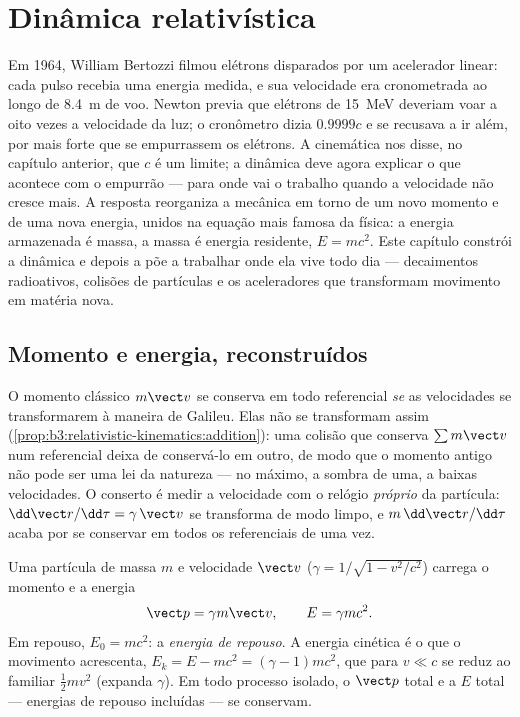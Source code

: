 \chapter{Dinâmica relativística}\label{ch:b3:relativistic-dynamics}

Em 1964, William Bertozzi filmou elétrons disparados por um acelerador
linear: cada pulso recebia uma energia medida, e sua velocidade era
cronometrada ao longo de \qty{8.4}{m} de voo. Newton previa que
elétrons de \qty{15}{MeV} deveriam voar a oito vezes a velocidade da
luz; o cronômetro dizia $0.9999c$ e se recusava a ir além, por mais
forte que se empurrassem os elétrons. A cinemática nos disse, no
capítulo anterior, que $c$ é um limite; a dinâmica deve agora explicar o
que acontece com o empurrão --- para onde vai o trabalho quando a
velocidade não cresce mais. A resposta reorganiza a mecânica em torno de
um novo momento e de uma nova energia, unidos na equação mais famosa da
física: a energia armazenada é massa, a massa é energia residente,
$E = mc^2$. Este capítulo constrói a dinâmica e depois a põe a
trabalhar onde ela vive todo dia --- decaimentos radioativos, colisões
de partículas e os aceleradores que transformam movimento em matéria
nova.

\section{Momento e energia, reconstruídos}

\begin{remark}\label{rem:b3:relativistic-dynamics:why}
O momento clássico $m\vect v$ se conserva em todo referencial \emph{se}
as velocidades se transformarem à maneira de Galileu. Elas não se
transformam assim (\cref{prop:b3:relativistic-kinematics:addition}):
uma colisão que conserva $\sum m\vect v$ num referencial deixa de
conservá-lo em outro, de modo que o momento antigo não pode ser uma lei
da natureza --- no máximo, a sombra de uma, a baixas velocidades. O
conserto é medir a velocidade com o relógio \emph{próprio} da
partícula: $\dd\vect r/\dd\tau =
\gamma\,\vect v$ se transforma de modo limpo, e $m\,\dd\vect r/\dd\tau$
acaba por se conservar em todos os referenciais de uma vez.
\end{remark}

\begin{definition}\label{def:b3:relativistic-dynamics:momentum-energy}
Uma partícula de massa $m$ e velocidade $\vect v$ ($\gamma = 1/\sqrt{1 -
v^2/c^2}$) carrega o momento e a energia
\[
\vect p = \gamma m\vect v , \qquad
E = \gamma mc^2 .
\]
Em repouso, $E_0 = mc^2$: a \emph{energia de repouso}. A energia
cinética é o que o movimento acrescenta,
$E_k = E - mc^2 = (\gamma - 1)mc^2$, que para $v
\ll c$ se reduz ao familiar $\tfrac12 mv^2$ (expanda $\gamma$). Em todo
processo isolado, o $\vect p$ total e a $E$ total --- energias de
repouso incluídas --- se conservam.
\end{definition}

